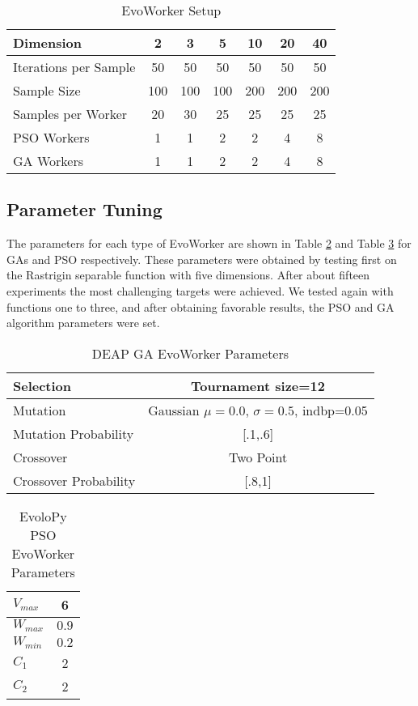 \documentclass[sigconf]{acmart}
\begin{document}
\begin{table}
  \small
  \caption{EvoWorker Setup}
  \label{tab:params} 
  \centering
  \small
  \begin{tabular}{|l|c|c|c|c|c|c|}
    \hline
    Dimension & 2 & 3 & 5 & 10 & 20 & 40\\ \hline
    Iterations per Sample  & 50 & 50 & 50 & 50 & 50 & 50\\ \hline
    Sample Size  & 100 & 100 & 100 & 200 & 200 & 200 \\ \hline
    Samples per Worker & 20 & 30 & 25 & 25 & 25 & 25  \\ \hline
    PSO Workers & 1 & 1 & 2 & 2 & 4 & 8  \\ \hline
    GA Workers & 1 & 1 & 2 & 2 & 4 & 8  \\ \hline
  \end{tabular}
\end{table}


\subsection{Parameter Tuning}

The parameters for each type of EvoWorker are shown in Table \ref{tab:GAparams}
and Table \ref{tab:PSOparams} for GAs and PSO respectively. These parameters 
were obtained by testing first on the Rastrigin separable function with 
five dimensions.  After about fifteen experiments the most challenging 
targets were achieved. We tested again with functions one to three, and 
after obtaining favorable results, the PSO and GA algorithm parameters were set.  
\begin{table}
  \small
  \caption{ DEAP GA EvoWorker Parameters }
  \label{tab:GAparams} 
  \centering
  \small
  \begin{tabular}{|l|c|}
    \hline
    Selection & Tournament size=12\\ \hline
    Mutation & Gaussian $\mu=0.0$, $\sigma=0.5$, indbp=0.05  \\ \hline
    Mutation Probability & [.1,.6]  \\ \hline
    Crossover & Two Point  \\ \hline
    Crossover Probability& [.8,1]  \\ \hline
  \end{tabular}
\end{table}

\begin{table}
  \small
  \caption{ EvoloPy PSO EvoWorker Parameters }
  \label{tab:PSOparams} 
  \centering
  \small
  \begin{tabular}{|l|c|}
    \hline
    $V_{max}$ & 6 \\ \hline
    $W_{max}$ & $0.9$ \\ \hline
    $W_{min}$ & $0.2$ \\ \hline
    $C_1$ & 2 \\ \hline
    $C_2$ & 2 \\ \hline
  \end{tabular}
\end{table}
\end{document}
